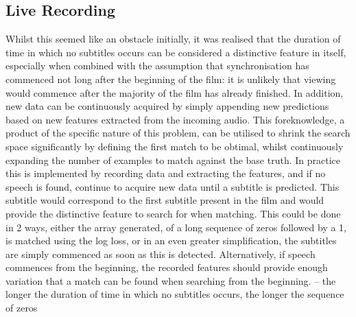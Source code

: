 \subsection{Live Recording}
Whilst this seemed like an obstacle initially, it was realised that the duration of time in which no subtitles occurs can be considered a distinctive feature in itself, especially when combined with the assumption that synchronisation has commenced not long after the beginning of the film: it is unlikely that viewing would commence after the majority of the film has already finished. In addition, new data can be continuously acquired by simply appending new predictions based on new features extracted from the incoming audio. This foreknowledge, a product of the specific nature of this problem, can be utilised to shrink the search space significantly by defining the first match to be obtimal, whilst continuously expanding the number of examples to match against the base truth. In practice this is implemented by recording data and extracting the features, and if no speech is found, continue to acquire new data until a subtitle is predicted. This subtitle would correspond to the first subtitle present in the film and would provide the distinctive feature to search for when matching. This could be done in 2 ways, either the array generated, of a long sequence of zeros followed by a 1, is matched using the log loss, or in an even greater simplification, the subtitles are simply commenced as soon as this is detected. Alternatively, if speech commences from the beginning, the recorded features should provide enough variation that a match can be found when searching from the beginning.
– the longer the duration of time in which no subtitles occurs, the longer the sequence of zeros 
